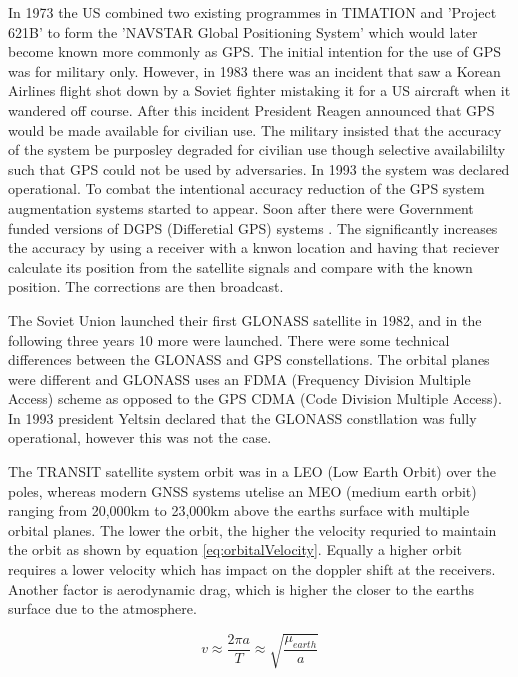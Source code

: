 In 1973 the US combined two existing programmes in TIMATION and 'Project 621B' to form the 'NAVSTAR Global Positioning System' which would later become known more
commonly as GPS. The initial intention for the use of GPS was for military only. However, in 1983 there was an incident that saw a Korean Airlines flight shot down by a
Soviet fighter mistaking it for a US aircraft when it wandered off course. After this incident President Reagen announced that GPS would be made available for civilian
use. The military insisted that the accuracy of the system be purposley degraded for civilian use though selective availabililty such that GPS could not be used by
adversaries. In 1993 the system was declared operational. To combat the intentional accuracy reduction of the GPS system augmentation systems started to appear. Soon
after there were Government funded versions of DGPS (Differetial GPS) systems \cite{RN43}. The significantly increases the accuracy by using a receiver with a knwon
location and having that reciever calculate its position from the satellite signals and compare with the known position. The corrections are then broadcast. 

The Soviet Union launched their first GLONASS satellite in 1982, and in the following three years 10 more were launched. There were some technical differences between the
GLONASS and GPS constellations. The orbital planes were different and GLONASS uses an FDMA (Frequency Division Multiple Access) scheme as opposed to the GPS CDMA (Code
Division Multiple Access). In 1993 president Yeltsin declared that the GLONASS constllation was fully operational, however this was not the case. 

The TRANSIT satellite system orbit was in a LEO (Low Earth Orbit) over the poles, whereas modern GNSS systems utelise an MEO (medium earth orbit) ranging from 20,000km to
23,000km above the earths surface with multiple orbital planes.
The lower the orbit, the higher the velocity requried to maintain the orbit as shown by equation \ref{eq:orbitalVelocity}. Equally a higher orbit requires a lower velocity which
has impact on the doppler shift at the receivers. Another factor is aerodynamic drag, which is higher the closer to the earths surface due to the atmosphere.

\begin{equation} \label{eq:orbitalVelocity}
    v \approx \frac{2\pi a}{T} \approx \sqrt{\frac{\mu_{earth}}{a}}
\end{equation} 



